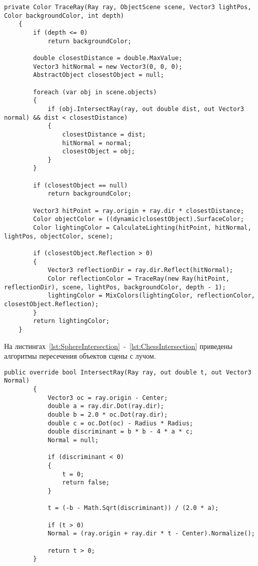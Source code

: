 \clearpage
\begin{center}
	\begin{lstlisting}[label={lst:RayTracing}, captionpos={b}, caption={Алгоритм трассировки лучей}]
	private Color TraceRay(Ray ray, ObjectScene scene, Vector3 lightPos, Color backgroundColor, int depth)
	{
		if (depth <= 0)
			return backgroundColor;
		
		double closestDistance = double.MaxValue;
		Vector3 hitNormal = new Vector3(0, 0, 0);
		AbstractObject closestObject = null;
		
		foreach (var obj in scene.objects)
		{
			if (obj.IntersectRay(ray, out double dist, out Vector3 normal) && dist < closestDistance)
			{
				closestDistance = dist;
				hitNormal = normal;
				closestObject = obj;
			}
		}
		
		if (closestObject == null)
			return backgroundColor;
		
		Vector3 hitPoint = ray.origin + ray.dir * closestDistance;
		Color objectColor = ((dynamic)closestObject).SurfaceColor;
		Color lightingColor = CalculateLighting(hitPoint, hitNormal, lightPos, objectColor, scene);
		
		if (closestObject.Reflection > 0)
		{
			Vector3 reflectionDir = ray.dir.Reflect(hitNormal);
			Color reflectionColor = TraceRay(new Ray(hitPoint, reflectionDir), scene, lightPos, backgroundColor, depth - 1);
			lightingColor = MixColors(lightingColor, reflectionColor, closestObject.Reflection);
		}
		return lightingColor;
	}
	\end{lstlisting}
\end{center}

На листингах~\ref{lst:SphereIntersection}~-~\ref{lst:ChessIntersection} приведены алгоритмы пересечения объектов сцены с лучом.

\begin{center}
	\begin{lstlisting}[label={lst:SphereIntersection}, captionpos={b}, caption={Алгоритм поиска точки пересечения луча со сферой}]
		public override bool IntersectRay(Ray ray, out double t, out Vector3 Normal)
		{
			Vector3 oc = ray.origin - Center;
			double a = ray.dir.Dot(ray.dir);
			double b = 2.0 * oc.Dot(ray.dir);
			double c = oc.Dot(oc) - Radius * Radius;
			double discriminant = b * b - 4 * a * c;
			Normal = null;
			
			if (discriminant < 0)
			{
				t = 0;
				return false;
			}
			
			t = (-b - Math.Sqrt(discriminant)) / (2.0 * a);
			
			if (t > 0)
			Normal = (ray.origin + ray.dir * t - Center).Normalize();
			
			return t > 0;
		}
	\end{lstlisting}
\end{center}

